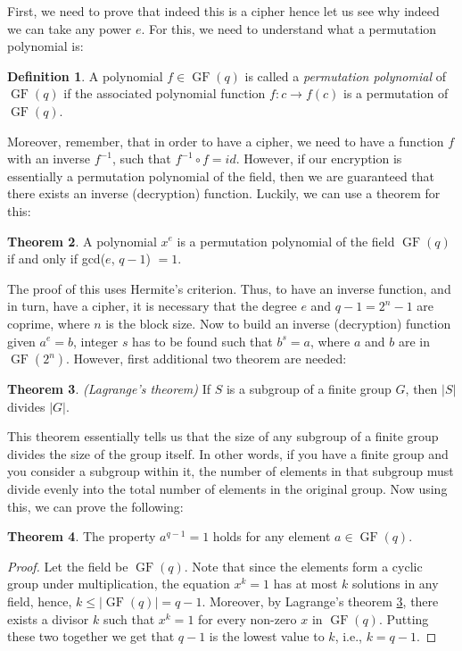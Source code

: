 \documentclass{Resources/UoBLab1}
\theoremstyle{definition}
\newtheorem{theorem}{Theorem}[section]
\newtheorem{definition}[theorem]{Definition}
\begin{document}
First, we need to prove that indeed this is a cipher hence let us see why indeed we can take any power $e$. For this, we need to understand what a permutation polynomial is:
\begin{definition}
    A polynomial $f \in \operatorname{GF}(q)$ is called a \textit{permutation polynomial} of $\operatorname{GF}(q)$ if the associated polynomial function $f : c \to f(c)$ is a permutation of $\operatorname{GF}(q)$.
\end{definition}
Moreover, remember, that in order to have a cipher, we need to have a function $f$ with an inverse $f^{-1}$, such that $f^{-1} \circ f = id$. However, if our encryption is essentially a permutation polynomial of the field, then we are guaranteed that there exists an inverse (decryption) function. Luckily, we can use a theorem for this:
\begin{theorem}
    A polynomial $x^e$ is a permutation polynomial of the field $\operatorname{GF}(q)$ if and only if gcd($e$, $q - 1$) $= 1$.
\end{theorem}
The proof of this uses Hermite's criterion\cite{PPIntro}. Thus, to have an inverse function, and in turn, have a cipher, it is necessary that the degree $e$ and $q - 1 = 2^n - 1$ are coprime, where $n$ is the block size. Now to build an inverse (decryption) function given $a^e = b$, integer $s$ has to be found such that $b^s = a$, where $a$ and $b$ are in $\operatorname{GF}(2^n)$. However, first additional two theorem are needed:
\begin{theorem}\label{thm:Lagrange}
    \textit{(Lagrange's theorem)} If $S$ is a subgroup of a finite group $G$, then $|S|$ divides $|G|$.
\end{theorem}
This theorem essentially tells us that the size of any subgroup of a finite group divides the size of the group itself. In other words, if you have a finite group and you consider a subgroup within it, the number of elements in that subgroup must divide evenly into the total number of elements in the original group. Now using this, we can prove the following:
\begin{theorem}\label{thm:GroupProp}
    The property $a^{q-1} = 1$ holds for any element $a \in \operatorname{GF}(q)$.
\end{theorem}
\begin{proof}
    Let the field be $\operatorname{GF}(q)$. Note that since the elements form a cyclic group under multiplication, the equation $x^k = 1$ has at most $k$ solutions in any field, hence, $k \le |\operatorname{GF}(q)| = q - 1$. Moreover, by Lagrange's theorem \ref{thm:Lagrange}, there exists a divisor $k$ such that $x^k = 1$ for every non-zero $x$ in $\operatorname{GF}(q)$. Putting these two together we get that $q-1$ is the lowest value to $k$, i.e., $k = q - 1$.
\end{proof}
\end{document}
